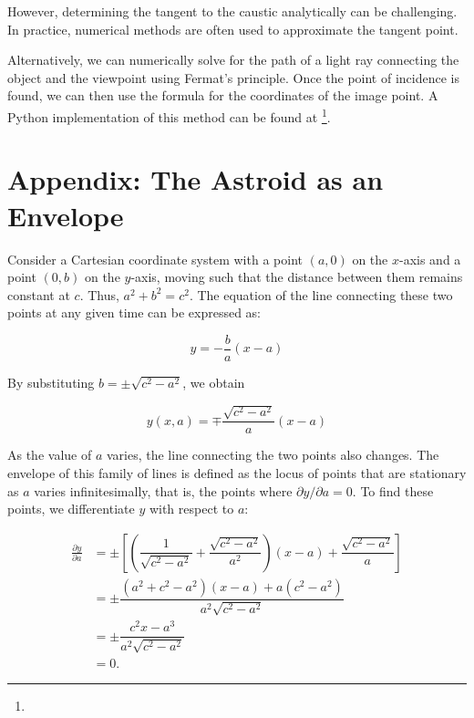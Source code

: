 \documentclass[twocolumn]{article}
\begin{document}
However, determining the tangent to the caustic analytically can be challenging. In practice, numerical methods are often used to approximate the tangent point.

Alternatively, we can numerically solve for the path of a light ray connecting the object and the viewpoint using Fermat's principle. Once the point of incidence is found, we can then use the formula for the coordinates of the image point. A Python implementation of this method can be found at  \href{https://github.com/mingshey/python_projects/blob/main/Refraction_Image_en.ipynb}{}\footnote{}.

\appendix
\newcommand{\pd}[2]{{\frac{\partial #1}{\partial #2}}}
\newcommand{\ilpd}[2]{{{\partial #1}/{\partial #2}}}
\section*{Appendix: The Astroid as an Envelope}

Consider a Cartesian coordinate system with a point $(a, 0)$ on the $x$-axis and a point $(0, b)$ on the $y$-axis, moving such that the distance between them remains constant at $c$. Thus, $a^2+b^2=c^2$. The equation of the line connecting these two points at any given time can be expressed as:

$$y=-\dfrac{b}{a}(x-a)$$

By substituting $b=\pm \sqrt{c^2-a^2}$, we obtain

$$y(x, a) = \mp \dfrac{\sqrt{c^2-a^2}}{a}(x-a)$$

As the value of $a$ varies, the line connecting the two points also changes. The envelope of this family of lines is defined as the locus of points that are stationary as $a$ varies infinitesimally, that is, the points where $\ilpd{y}{a} = 0$. To find these points, we differentiate $y$ with respect to $a$:

$$ \begin{aligned}
	\pd{y}{a} &= \pm\left[\left( \dfrac{1}{\sqrt{c^2-a^2}}+\dfrac{\sqrt{c^2-a^2}}{a^2}\right) (x-a) + \dfrac{\sqrt{c^2-a^2}}{a} \right]\\
	&= \pm \dfrac{(a^2+c^2-a^2)(x-a)+a(c^2-a^2)}{a^2\sqrt{c^2-a^2}}\\
	&= \pm \dfrac{c^2 x - a^3}{a^2 \sqrt{c^2 - a^2}}\\
	&= 0.
\end{aligned}
$$
\end{document}
